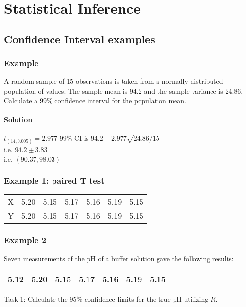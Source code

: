 \chapter{Statistical Inference}

\section{Confidence Interval examples}

\subsection{Example}
A random sample of 15 observations is taken from a normally distributed population
of values. The sample mean is 94.2 and the sample variance is 24.86.
Calculate a 99\% confidence interval for the population mean.


\subsubsection{Solution}
$t_(14,0.005) = 2.977$
99\% CI is $94.2 \pm 2.977 \sqrt{24.86/15}$ \\i.e. $94.2 \pm 3.83$ \\i.e. $(90.37,98.03)$


\subsection{Example 1: paired T test}


\begin{tabular}{|c|c|c|c|c|c|c|}
  \hline
X & 5.20 & 5.15 & 5.17 & 5.16 & 5.19 & 5.15\\
Y & 5.20 & 5.15 & 5.17 & 5.16 & 5.19 & 5.15\\
  \hline
\end{tabular}


\subsection{Example 2}

Seven measurements of the pH of a buffer solution gave the
following results:

\begin{tabular}{|c|c|c|c|c|c|c|}
  \hline
5.12 & 5.20 & 5.15 & 5.17 & 5.16 & 5.19 & 5.15\\
  \hline
\end{tabular}

Task 1: Calculate the 95\% confidence limits for the true pH
utilizing $R$.


